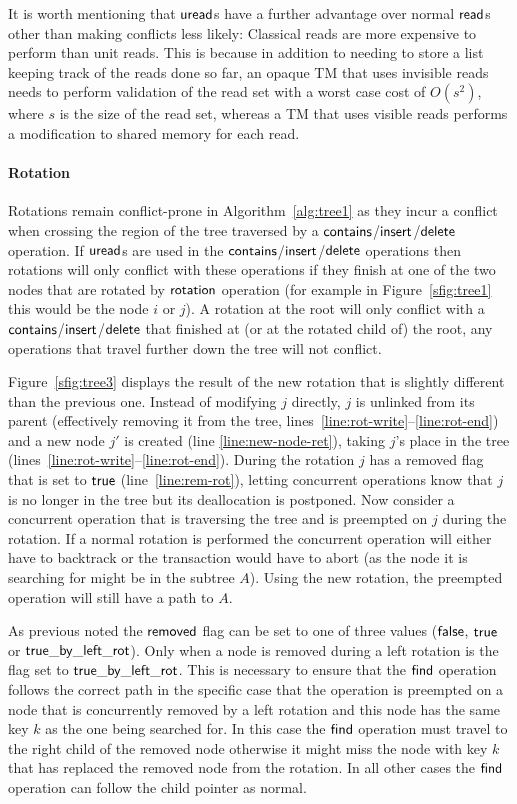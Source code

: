 It is worth mentioning that $\act{uread}$s have a further advantage over normal $\act{read}$s other than making conflicts less likely:
Classical reads are more expensive to perform than unit reads.
This is because in addition to needing to store a list keeping track of the reads done so far, 
an opaque TM that uses invisible reads needs to perform validation of the read set with a worst case cost of 
$O(s^2)$,
where $s$ is the size of the read set, whereas a TM that uses visible reads performs a modification to shared memory for each read.

\paragraph{Rotation}
Rotations remain conflict-prone in Algorithm~\ref{alg:tree1} as they incur a conflict when crossing the region of the tree traversed by a  $\act{contains}$/$\act{insert}$/$\act{delete}$ operation. 
If $\act{uread}$s are used in the $\act{contains}$/$\act{insert}$/$\act{delete}$ operations then rotations will only conflict with these operations if they
finish at one of the two nodes that are rotated by $\act{rotation}$ operation
(for example in Figure~\ref{sfig:tree1} this would be the node $i$ or $j$).
A rotation at the root will only conflict with a $\act{contains}$/$\act{insert}$/$\act{delete}$ that finished at (or at the rotated child of) the root, any operations that travel further down the tree will not conflict.

Figure~\ref{sfig:tree3} displays the result of the new rotation that is slightly different than the previous one.
Instead of modifying $j$ directly, $j$ is unlinked from its parent (effectively removing it from the tree, lines~\ref{line:rot-write}--\ref{line:rot-end})
and a new node $j'$ is created (line \ref{line:new-node-ret}), taking $j$'s place in the tree (lines~\ref{line:rot-write}--\ref{line:rot-end}).
During the rotation $j$ has a removed flag that is set to $\lit{true}$ (line~\ref{line:rem-rot}), letting concurrent operations know that $j$ is no longer in the tree but its deallocation is postponed. 
Now consider a concurrent operation that is traversing the tree and is preempted on $j$ during the rotation.
If a normal rotation is performed the concurrent operation will either have to backtrack or the transaction would have to abort (as the node it is searching for might be in the subtree $A$).
Using the new rotation, the preempted operation will still have a path to $A$.

As previous noted the $\lit{removed}$ flag can be set to one of three values ($\lit{false}$, $\lit{true}$ or $\lit{true\_by\_left\_rot}$).
Only when a node is removed during a left rotation is the flag set to $\lit{true\_by\_left\_rot}$.
This is necessary to ensure that the $\act{find}$ operation follows the correct path in the specific case that the operation is preempted on a node that is concurrently removed by a
left rotation and this node has the same key $k$ as the one being searched for.
In this case the $\act{find}$ operation must travel to the right child of the removed node otherwise it might miss the node with key $k$ that
has replaced the removed node from the rotation.
In all other cases the $\act{find}$ operation can follow the child pointer as normal.

